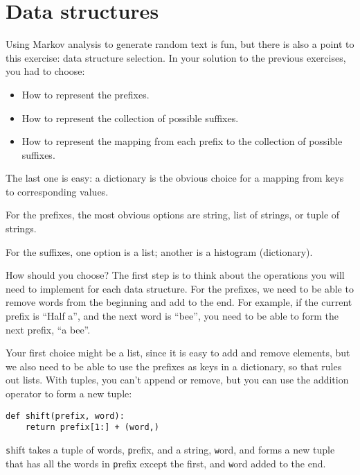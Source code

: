 \documentclass[
DIV=11,
fontsize=12,
twoside,
headinclude=false,
titlepage=firstiscover,
abstract=true,
headsepline=true,
footsepline=true,
chapterprefix=true, %
headings=big,
bibliography=totoc,%
captions=tableheading
]{scrbook}
\theoremstyle{definition}
\begin{document}
\section{Data structures}

Using Markov analysis to generate random text is fun, but there is
also a point to this exercise: data structure selection.  In your
solution to the previous exercises, you had to choose:

\begin{itemize}

\item How to represent the prefixes.

\item How to represent the collection of possible suffixes.

\item How to represent the mapping from each prefix to
the collection of possible suffixes.

\end{itemize}

The last one is easy: a dictionary is the obvious choice
for a mapping from keys to corresponding values.

For the prefixes, the most obvious options are string,
list of strings, or tuple of strings.

For the suffixes,
one option is a list; another is a histogram (dictionary).

How should you choose?  The first step is to think about
the operations you will need to implement for each data structure.
For the prefixes, we need to be able to remove words from
the beginning and add to the end.  For example, if the current
prefix is ``Half a'', and the next word is ``bee'', you need
to be able to form the next prefix, ``a bee''.

Your first choice might be a list, since it is easy to add
and remove elements, but we also need to be able to use the
prefixes as keys in a dictionary, so that rules out lists.
With tuples, you can't append or remove, but you can use
the addition operator to form a new tuple:

\begin{lstlisting}
def shift(prefix, word):
    return prefix[1:] + (word,)
\end{lstlisting}
%
{\texttt shift} takes a tuple of words, {\texttt prefix}, and a string, 
{\texttt word}, and forms a new tuple that has all the words
in {\texttt prefix} except the first, and {\texttt word} added to
the end.
\end{document}
